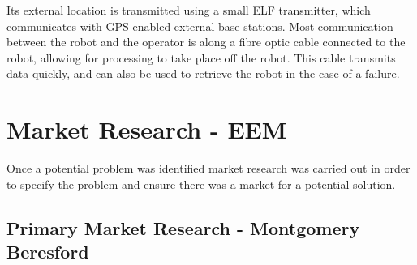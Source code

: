 \documentclass[11pt]{article}		%
\begin{document}
			\begin{floatingfigure}[r]{0pt} \end{floatingfigure}
			
			Its external location is transmitted using a small ELF transmitter, which communicates with GPS enabled external base stations. 
			Most communication between the robot and the operator is along a fibre optic cable connected to the robot, allowing for processing to take place off the robot.
			This cable transmits data quickly, and can also be used to retrieve the robot in the case of a failure.
			
	
	
	

    \section{Market Research - EEM}
        
        Once a potential problem was identified market research was carried out in order to specify the problem and ensure there was a market for a potential solution. 
        
        \subsection[Primary Market Research]{Primary Market Research - Montgomery Beresford}
        
\end{document}
